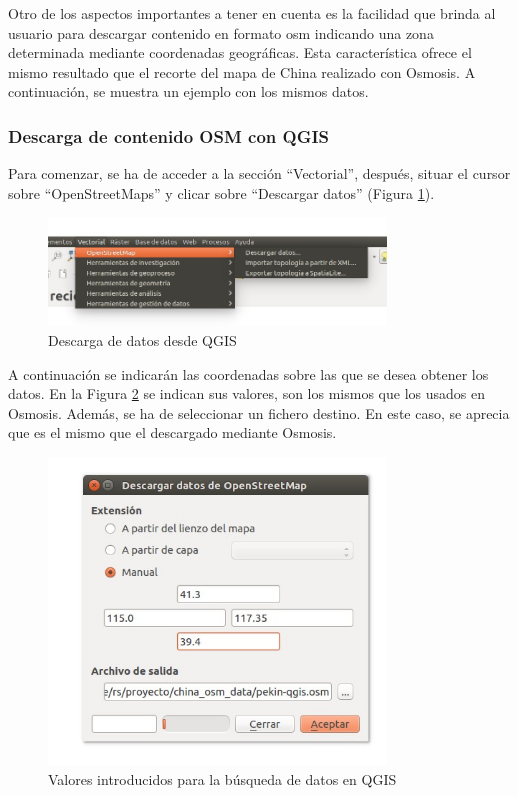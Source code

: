 Otro de los aspectos importantes a tener en cuenta es la facilidad que brinda al usuario para descargar contenido en formato osm indicando una zona determinada mediante coordenadas geográficas. Esta característica ofrece el mismo resultado que el recorte del mapa de China realizado con Osmosis. A continuación, se muestra un ejemplo con los mismos datos.

\subsubsection{Descarga de contenido OSM con QGIS}
Para comenzar, se ha de acceder a la sección ``Vectorial'', después, situar el cursor sobre ``OpenStreetMaps'' y clicar sobre ``Descargar datos'' (Figura \ref{vectorial}).

\begin{figure}[h]
  \centering
    \includegraphics[width=0.8\textwidth]{../img/qgis/descarga.jpg}
  \caption{Descarga de datos desde QGIS}
  \label{vectorial}
\end{figure}

A continuación se indicarán las coordenadas sobre las que se desea obtener los datos. En la Figura \ref{datos} se indican sus valores, son los mismos que los usados en Osmosis. Además, se ha de seleccionar un fichero destino. En este caso, se aprecia que es el mismo que el descargado mediante Osmosis.

\begin{figure}[h]
  \centering
    \includegraphics[width=0.8\textwidth]{../img/qgis/pekin-qgis.jpg}
  \caption{Valores introducidos para la búsqueda de datos en QGIS}
  \label{datos}
\end{figure}

